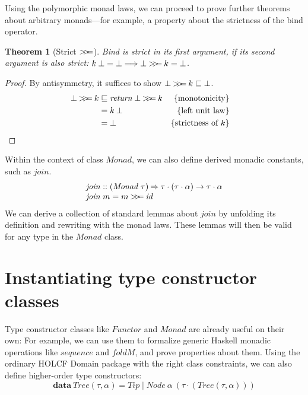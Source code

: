 \documentclass{sigplanconf}
\newcommand{\hsbind}{\mathbin{>\mkern-6mu>\mkern-6.5mu=}}
\newcommand{\To}{\mathbin{\Rightarrow}}
\newcommand{\below}{\sqsubseteq}
\newcommand{\kwd}[1]{\mathbf{#1}}
\newcommand{\hsc}[1]{\ensuremath{\mathit{#1}}}
\newcommand{\hsid}{\hsc{id}}
\newcommand{\tA}{\alpha}
\newcommand{\tT}{\tau}
\newcommand{\justification}[1]{\{\text{#1}\}}
\newtheorem{theorem}{Theorem}
\theoremstyle{definition}
\begin{document}
Using the polymorphic monad laws, we can proceed to prove further theorems about arbitrary monads---for example, a property about the strictness of the bind operator.

\begin{theorem}[Strict $\hsbind$]
\label{thm:strict-bind}
Bind is strict in its first argument, if its second argument is also strict: $k\:\bot = \bot \Longrightarrow \bot \hsbind k = \bot$.
\end{theorem}
\begin{proof}
By antisymmetry, it suffices to show $\bot \hsbind k \below \bot$.
\begin{align*}
  \bot \hsbind k
  &\below \hsc{return}\:\bot \hsbind k & \justification{monotonicity} \\
  &= k\:\bot & \justification{left unit law} \\
  &= \bot & \justification{strictness of $k$} & \qedhere
\end{align*}
\end{proof}

Within the context of class \hsc{Monad}, we can also define derived monadic constants, such as \hsc{join}.
%
\begin{align*}
  & \hsc{join} :: (\hsc{Monad}\;\tT) \To \tT\cdot(\tT\cdot\tA) \to \tT\cdot\tA
  \\[-\jot]
  & \hsc{join}\;m = m \hsbind \hsid
\end{align*}
%
We can derive a collection of standard lemmas about \hsc{join} by unfolding its definition and rewriting with the monad laws. These lemmas will then be valid for any type in the \hsc{Monad} class.

\section{Instantiating type constructor classes}
\label{sec:instantiation}

Type constructor classes like \hsc{Functor} and \hsc{Monad} are already useful on their own: For example, we can use them to formalize generic Haskell monadic operations like \hsc{sequence} and \hsc{foldM}, and prove properties about them. Using the ordinary HOLCF Domain package with the right class constraints, we can also define higher-order type constructors:
%
\begin{equation*}
  \kwd{data}\:\hsc{Tree}(\tT,\tA) = \hsc{Tip} \mid \hsc{Node}\:\tA\:(\tT\cdot(\hsc{Tree}(\tT,\tA)))
\end{equation*}
\end{document}
